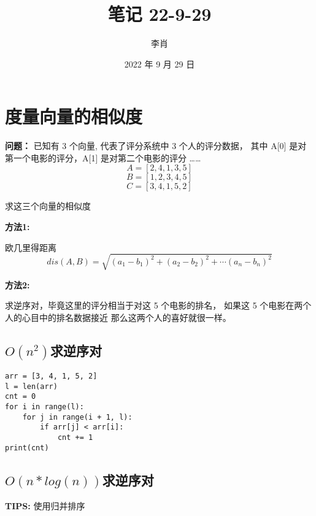 \documentclass[UTF8]{ctexart}
\title{笔记 22-9-29}
\author{李肖}
\date{2022 年 9 月 29 日}
\begin{document}
\maketitle
\section{度量向量的相似度}

\textbf{问题： }已知有 3 个向量, 代表了评分系统中 3 个人的评分数据，
其中 A[0] 是对第一个电影的评分，A[1] 是对第二个电影的评分 ……
$$ A = [2, 4, 1, 3, 5] $$
$$ B = [1, 2, 3, 4, 5] $$
$$ C = [3, 4, 1, 5, 2] $$

求这三个向量的相似度

\vskip 0.3cm
\textbf{方法1:}

欧几里得距离
$$ dis(A, B) = \sqrt{(a_1 - b_1) ^ 2 + (a_2 - b_2) ^ 2 + \cdots (a_n - b_n) ^ 2} $$

\vskip 0.3cm
\textbf{方法2:}

求逆序对，毕竟这里的评分相当于对这 5 个电影的排名，
如果这 5 个电影在两个人的心目中的排名数据接近
那么这两个人的喜好就很一样。

\subsection{$O(n^2)$求逆序对}

\begin{lstlisting}
arr = [3, 4, 1, 5, 2]
l = len(arr)
cnt = 0
for i in range(l):
    for j in range(i + 1, l):
        if arr[j] < arr[i]:
            cnt += 1
print(cnt)
\end{lstlisting}

\subsection{$O(n*log(n))$求逆序对}

\noindent
\textbf{TIPS: }使用归并排序
\end{document}
